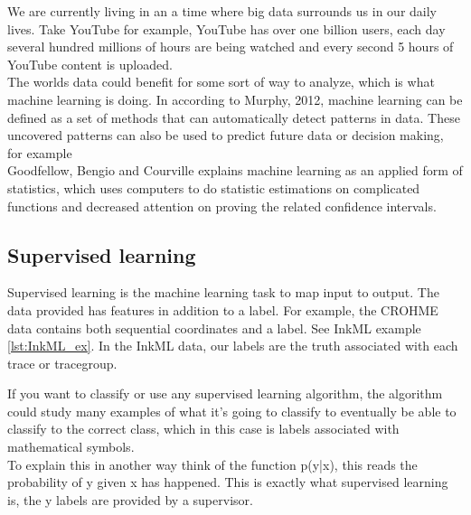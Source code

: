 We are currently living in an a time where big data surrounds us in our daily lives. Take YouTube for example, YouTube has over one billion users, each day several hundred millions of hours are being watched and every second 5 hours of YouTube content is uploaded. \\ %
The worlds data could benefit for some sort of way to analyze, which is what machine learning is doing. In according to Murphy, 2012, machine learning can be defined as a set of methods that can automatically detect patterns in data. These uncovered patterns can also be used to predict future data or decision making, for example %
\\
Goodfellow, Bengio and Courville explains machine learning as an applied form of statistics, which uses computers to do statistic estimations on complicated functions and decreased attention on proving the related confidence intervals. %


% 


% 
\subsection{Supervised learning}
Supervised learning is the machine learning task to map input to output. The data provided has features in addition to a label. For example, the CROHME data contains both sequential coordinates and a label. See InkML example \ref{lst:InkML_ex}. In the InkML data, our labels are the truth associated with each trace or tracegroup.


If you want to classify or use any supervised learning algorithm, the algorithm could study many examples of what it's going to classify to eventually be able to classify to the correct class, which in this case is labels associated with mathematical symbols.\\ To explain this in another way think of the function p(y|x), this reads the probability of y given x has happened. This is exactly what supervised learning is, the y labels are provided by a supervisor.\\

